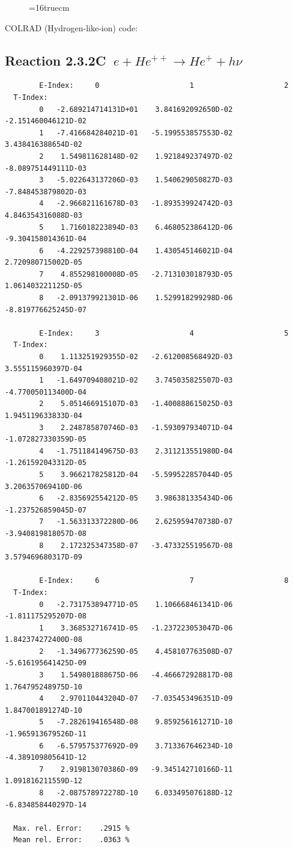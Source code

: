 \documentclass[12pt,dvips]{article}
\begin{document}
\begin{figure} \label{2.3.2B1}
\epsfxsize=16truecm
\end{figure}
\newpage
COLRAD (Hydrogen-like-ion) code:
\subsection{
Reaction 2.3.2C   $\  e + He^{++} \rightarrow  He^+ + h\nu$
}

\begin{small}\begin{verbatim}
        E-Index:     0                     1                     2
  T-Index:
        0   -2.689214714131D+01    3.841692092650D-02   -2.151460046121D-02
        1   -7.416684284021D-01   -5.199553857553D-02    3.438416388654D-02
        2    1.549811628148D-02    1.921849237497D-02   -8.089751449111D-03
        3   -5.022643137206D-03    1.540629050827D-03   -7.848453879802D-03
        4   -2.966821161678D-03   -1.893539924742D-03    4.846354316088D-03
        5    1.716018223894D-03    6.468052386412D-06   -9.304158014361D-04
        6   -4.229257398810D-04    1.430545146021D-04    2.720980715002D-05
        7    4.855298100008D-05   -2.713103018793D-05    1.061403221125D-05
        8   -2.091379921301D-06    1.529918299298D-06   -8.819776625245D-07

        E-Index:     3                     4                     5
  T-Index:
        0    1.113251929355D-02   -2.612008568492D-03    3.555115960397D-04
        1   -1.649709408021D-02    3.745035825507D-03   -4.770050113400D-04
        2    5.051466915107D-03   -1.400888615025D-03    1.945119633833D-04
        3    2.248785870746D-03   -1.593097934071D-04   -1.072827330359D-05
        4   -1.751184149675D-03    2.311213551980D-04   -1.261592043312D-05
        5    3.966217825812D-04   -5.599522857044D-05    3.206357069410D-06
        6   -2.835692554212D-05    3.986381335434D-06   -1.237526859045D-07
        7   -1.563313372280D-06    2.625959470738D-07   -3.940819818057D-08
        8    2.172325347358D-07   -3.473325519567D-08    3.579469680317D-09

        E-Index:     6                     7                     8
  T-Index:
        0   -2.731753894771D-05    1.106668461341D-06   -1.811175295207D-08
        1    3.368532716741D-05   -1.237223053047D-06    1.842374272400D-08
        2   -1.349677736259D-05    4.458107763508D-07   -5.616195641425D-09
        3    1.549801888675D-06   -4.466672928817D-08    1.764795248975D-10
        4    2.970110443204D-07   -7.035453496351D-09    1.847001891274D-10
        5   -7.282619416548D-08    9.859256161271D-10   -1.965913679526D-11
        6   -6.579575377692D-09    3.713367646234D-10   -4.389109805641D-12
        7    2.919813070386D-09   -9.345142710166D-11    1.091816211559D-12
        8   -2.087578972278D-10    6.033495076188D-12   -6.834858440297D-14

  Max. rel. Error:    .2915 %
  Mean rel. Error:    .0363 %


\end{verbatim}\end{small}
\end{document}
